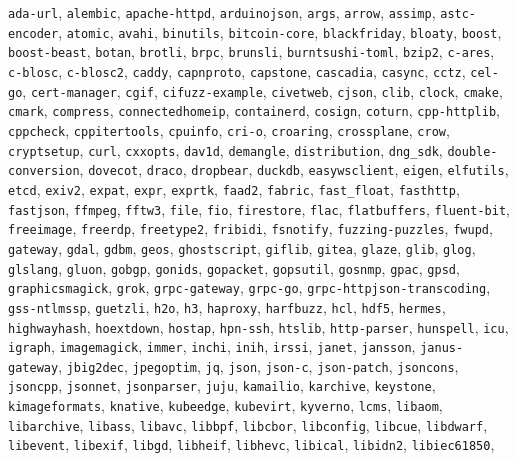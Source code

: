 {
\footnotesize
\texttt{ada-url}, \texttt{alembic}, \texttt{apache-httpd}, \texttt{arduinojson}, \texttt{args}, \texttt{arrow}, \texttt{assimp}, \texttt{astc-encoder}, \texttt{atomic}, \texttt{avahi}, \texttt{binutils}, \texttt{bitcoin-core}, \texttt{blackfriday}, \texttt{bloaty}, \texttt{boost}, \texttt{boost-beast}, \texttt{botan}, \texttt{brotli}, \texttt{brpc}, \texttt{brunsli}, \texttt{burntsushi-toml}, \texttt{bzip2}, \texttt{c-ares}, \texttt{c-blosc}, \texttt{c-blosc2}, \texttt{caddy}, \texttt{capnproto}, \texttt{capstone}, \texttt{cascadia}, \texttt{casync}, \texttt{cctz}, \texttt{cel-go}, \texttt{cert-manager}, \texttt{cgif}, \texttt{cifuzz-example}, \texttt{civetweb}, \texttt{cjson}, \texttt{clib}, \texttt{clock}, \texttt{cmake}, \texttt{cmark}, \texttt{compress}, \texttt{connectedhomeip}, \texttt{containerd}, \texttt{cosign}, \texttt{coturn}, \texttt{cpp-httplib}, \texttt{cppcheck}, \texttt{cppitertools}, \texttt{cpuinfo}, \texttt{cri-o}, \texttt{croaring}, \texttt{crossplane}, \texttt{crow}, \texttt{cryptsetup}, \texttt{curl}, \texttt{cxxopts}, \texttt{dav1d}, \texttt{demangle}, \texttt{distribution}, \texttt{dng\_sdk}, \texttt{double-conversion}, \texttt{dovecot}, \texttt{draco}, \texttt{dropbear}, \texttt{duckdb}, \texttt{easywsclient}, \texttt{eigen}, \texttt{elfutils}, \texttt{etcd}, \texttt{exiv2}, \texttt{expat}, \texttt{expr}, \texttt{exprtk}, \texttt{faad2}, \texttt{fabric}, \texttt{fast\_float}, \texttt{fasthttp}, \texttt{fastjson}, \texttt{ffmpeg}, \texttt{fftw3}, \texttt{file}, \texttt{fio}, \texttt{firestore}, \texttt{flac}, \texttt{flatbuffers}, \texttt{fluent-bit}, \texttt{freeimage}, \texttt{freerdp}, \texttt{freetype2}, \texttt{fribidi}, \texttt{fsnotify}, \texttt{fuzzing-puzzles}, \texttt{fwupd}, \texttt{gateway}, \texttt{gdal}, \texttt{gdbm}, \texttt{geos}, \texttt{ghostscript}, \texttt{giflib}, \texttt{gitea}, \texttt{glaze}, \texttt{glib}, \texttt{glog}, \texttt{glslang}, \texttt{gluon}, \texttt{gobgp}, \texttt{gonids}, \texttt{gopacket}, \texttt{gopsutil}, \texttt{gosnmp}, \texttt{gpac}, \texttt{gpsd}, \texttt{graphicsmagick}, \texttt{grok}, \texttt{grpc-gateway}, \texttt{grpc-go}, \texttt{grpc-httpjson-transcoding}, \texttt{gss-ntlmssp}, \texttt{guetzli}, \texttt{h2o}, \texttt{h3}, \texttt{haproxy}, \texttt{harfbuzz}, \texttt{hcl}, \texttt{hdf5}, \texttt{hermes}, \texttt{highwayhash}, \texttt{hoextdown}, \texttt{hostap}, \texttt{hpn-ssh}, \texttt{htslib}, \texttt{http-parser}, \texttt{hunspell}, \texttt{icu}, \texttt{igraph}, \texttt{imagemagick}, \texttt{immer}, \texttt{inchi}, \texttt{inih}, \texttt{irssi}, \texttt{janet}, \texttt{jansson}, \texttt{janus-gateway}, \texttt{jbig2dec}, \texttt{jpegoptim}, \texttt{jq}, \texttt{json}, \texttt{json-c}, \texttt{json-patch}, \texttt{jsoncons}, \texttt{jsoncpp}, \texttt{jsonnet}, \texttt{jsonparser}, \texttt{juju}, \texttt{kamailio}, \texttt{karchive}, \texttt{keystone}, \texttt{kimageformats}, \texttt{knative}, \texttt{kubeedge}, \texttt{kubevirt}, \texttt{kyverno}, \texttt{lcms}, \texttt{libaom}, \texttt{libarchive}, \texttt{libass}, \texttt{libavc}, \texttt{libbpf}, \texttt{libcbor}, \texttt{libconfig}, \texttt{libcue}, \texttt{libdwarf}, \texttt{libevent}, \texttt{libexif}, \texttt{libgd}, \texttt{libheif}, \texttt{libhevc}, \texttt{libical}, \texttt{libidn2}, \texttt{libiec61850}, }

